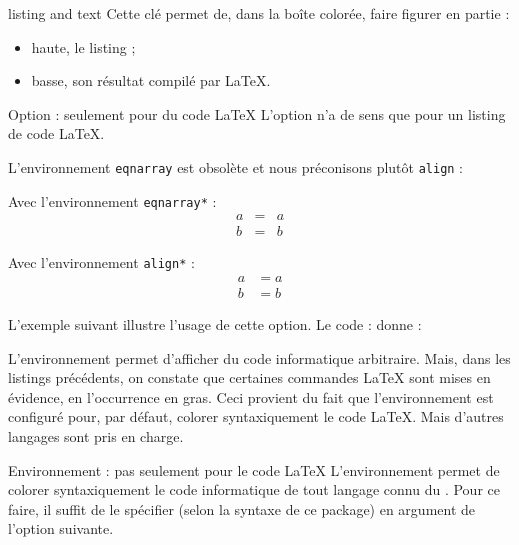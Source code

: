 \begin{docKey}{listing and text}{}{}
  Cette clé permet de, dans la boîte colorée, faire figurer en partie :
  \begin{itemize}
  \item haute, le listing ;
  \item basse, son résultat compilé par \LaTeX{}.
  \end{itemize}
  \begin{dbwarning}{Option \protect{} : seulement pour
      du code \LaTeX{}}{}
    L'option  n'a de sens que pour un listing de code
    \LaTeX{}.
  \end{dbwarning}
\begin{tcboutputlisting}
\begin{gztcode}
L'environnement \verb|eqnarray| est obsolète et nous préconisons plutôt
\verb|align| :

\begin{minipage}[t]{0.4\linewidth}
  Avec l'environnement \verb|eqnarray*| :
  \begin{eqnarray*}
    a & = & a\\
    b & = & b
  \end{eqnarray*}
\end{minipage}
\hspace{1cm}
\begin{minipage}[t]{0.4\linewidth}
  Avec l'environnement \verb|align*| :
  \begin{align*}
    a & = a\\
    b & = b
  \end{align*}
\end{minipage}
\end{gztcode}
\end{tcboutputlisting}
L'exemple suivant illustre l'usage de cette option\conseilslatex{}. Le
code :
donne :

\end{docKey}

L'environnement  permet d'afficher du code informatique
arbitraire.  Mais, dans les listings précédents, on constate que certaines
commandes \LaTeX{} sont mises en évidence, en l'occurrence en gras. Ceci
provient du fait que l'environnement  est configuré pour, par
défaut, colorer syntaxiquement le code \LaTeX{}. Mais d'autres langages sont
pris en charge.

\begin{dbremark}{Environnement \protect{} : pas seulement pour le
    code \LaTeX{}}{}
  L'environnement  permet de colorer syntaxiquement le code
  informatique de tout langage connu du . Pour ce faire, il
  suffit de le spécifier (selon la syntaxe de ce package) en argument de
  l'option  suivante.
\end{dbremark}

